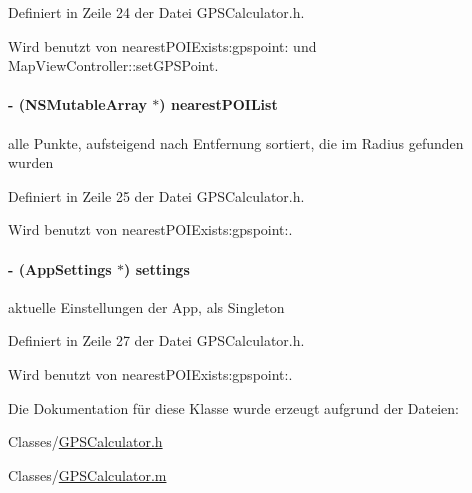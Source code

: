 Definiert in Zeile 24 der Datei GPSCalculator.h.

Wird benutzt von nearestPOIExists:gpspoint: und MapViewController::setGPSPoint.\hypertarget{interface_g_p_s_calculator_ad35926f5862c782550e8fb53c72d9ce7}{
\paragraph[{nearestPOIList}]{\setlength{\rightskip}{0pt plus 5cm}-\/ (NSMutableArray $\ast$) nearestPOIList}\hfill}
\label{interface_g_p_s_calculator_ad35926f5862c782550e8fb53c72d9ce7}
alle Punkte, aufsteigend nach Entfernung sortiert, die im Radius gefunden wurden 

Definiert in Zeile 25 der Datei GPSCalculator.h.

Wird benutzt von nearestPOIExists:gpspoint:.\hypertarget{interface_g_p_s_calculator_a16945732145e0f6c1541b57c7a9bf50e}{
\paragraph[{settings}]{\setlength{\rightskip}{0pt plus 5cm}-\/ ({\bf AppSettings} $\ast$) settings}\hfill}
\label{interface_g_p_s_calculator_a16945732145e0f6c1541b57c7a9bf50e}
aktuelle Einstellungen der App, als Singleton 

Definiert in Zeile 27 der Datei GPSCalculator.h.

Wird benutzt von nearestPOIExists:gpspoint:.

Die Dokumentation für diese Klasse wurde erzeugt aufgrund der Dateien:\begin{DoxyCompactItemize}
\item 
Classes/\hyperlink{_g_p_s_calculator_8h}{GPSCalculator.h}\item 
Classes/\hyperlink{_g_p_s_calculator_8m}{GPSCalculator.m}\end{DoxyCompactItemize}
